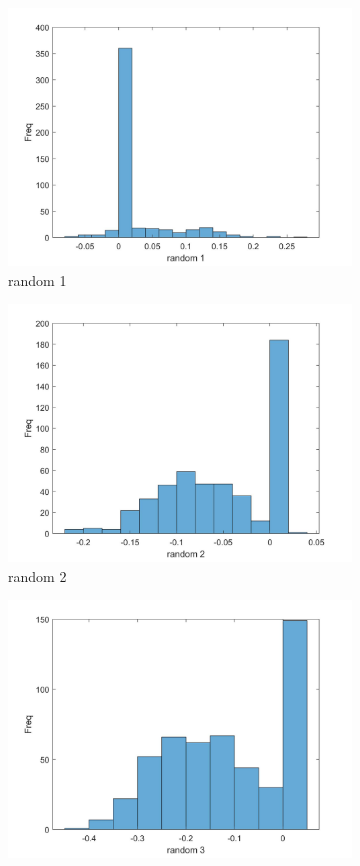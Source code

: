 \documentclass{article}
\begin{document}
\begin{figure}[ht] 
	\begin{subfigure}[b]{0.5\linewidth}
		\centering
		\includegraphics[width=0.75\linewidth]{figures/q8_random1.jpg} 
		\caption{random 1} 
		\label{r1} 
		\vspace{2ex}
	\end{subfigure}%
	\begin{subfigure}[b]{0.5\linewidth}
		\centering
		\includegraphics[width=0.75\linewidth]{figures/q8_random2.jpg} 
		\caption{random 2} 
		\label{r2} 
		\vspace{2ex}
	\end{subfigure} 
	\begin{subfigure}[b]{0.5\linewidth}
		\centering
		\includegraphics[width=0.75\linewidth]{figures/q8_random3.jpg} 

\end{subfigure}
\end{figure}
\end{document}
